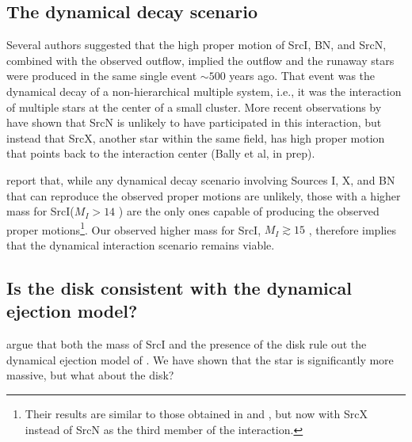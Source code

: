\documentclass[twocolumn]{aastex62}
\newcommand{\sourcei}{SrcI\xspace}
\newcommand{\sourcen}{SrcN\xspace}
\newcommand{\sourcex}{SrcX\xspace}
\begin{document}
\subsection{The dynamical decay scenario}
Several authors \citep[][]{Gomez2008a,Goddi2011b,Bally2011a} suggested that
the high proper
motion of \sourcei, BN, and \sourcen, combined with the observed \hh outflow,
implied the outflow and the runaway stars were produced in the same single
event $\sim500$ years ago.  That event was the dynamical decay of a
non-hierarchical multiple system, i.e., it was the interaction of multiple
stars at the center of a small cluster.  More recent observations by
\citet{Luhman2017a} have shown that \sourcen is unlikely to have participated
in this interaction, but instead that \sourcex, another star within the same
field, has high proper motion that points back to the interaction center (Bally et al,
in prep).

\citet{Farias2017b} report that, while any dynamical decay scenario involving
Sources I, X, and BN that can reproduce the observed proper motions are
unlikely, those with a higher mass for \sourcei ($M_I>14$ \msun) are the only
ones capable of producing the observed proper motions\footnote{Their results
are similar to those obtained in \citet{Goddi2011b} and \citet{Moeckel2012b},
but now with \sourcex instead of \sourcen as the third member of the
interaction.}.  Our observed higher mass for \sourcei, $M_I\gtrsim15$ \msun,
therefore implies that the
dynamical interaction scenario remains viable.



\subsection{Is the disk consistent with the dynamical ejection model?}
\citet{Plambeck2016a} argue that both the mass of \sourcei and the presence of
the disk rule out the dynamical ejection model of \citet{Bally2011a}.  We have
shown that the star is significantly more massive, but what about the disk?
\end{document}
